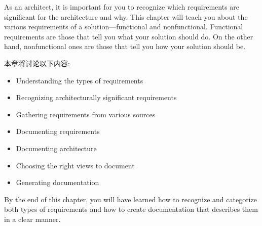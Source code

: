 As an architect, it is important for you to recognize which requirements are significant for the architecture and why. This chapter will teach you about the various requirements of a solution—functional and nonfunctional. Functional requirements are those that tell you what your solution should do. On the other hand, nonfunctional ones are those that tell you how your solution should be.

本章将讨论以下内容:

\begin{itemize}
\item Understanding the types of requirements
\item Recognizing architecturally significant requirements
\item Gathering requirements from various sources
\item Documenting requirements
\item Documenting architecture
\item Choosing the right views to document
\item Generating documentation

\end{itemize}

By the end of this chapter, you will have learned how to recognize and categorize both types of requirements and how to create documentation that describes them in a clear manner.